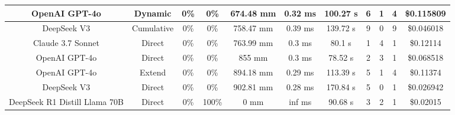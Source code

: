 \begin{landscape}
\begin{table}[H]
\begin{center}
\begin{tabular}{|c|c|c|c|c|c|c|c|c|c|c|}
    OpenAI GPT-4o & Dynamic & 0\% & 0\% & 674.48 mm & 0.32 ms & 100.27 s & 6 & 1 & 4 & \$0.115809 \\
    \hline
    DeepSeek V3 & Cumulative & 0\% & 0\% & 758.47 mm & 0.39 ms & 139.72 s & 9 & 0 & 9 & \$0.046018 \\
    \hline
    Claude 3.7 Sonnet & Direct & 0\% & 0\% & 763.99 mm & 0.3 ms & 80.1 s & 1 & 4 & 1 & \$0.12114 \\
    \hline
    OpenAI GPT-4o & Direct & 0\% & 0\% & 855 mm & 0.3 ms & 78.52 s & 2 & 3 & 1 & \$0.068518 \\
    \hline
    OpenAI GPT-4o & Extend & 0\% & 0\% & 894.18 mm & 0.29 ms & 113.39 s & 5 & 1 & 4 & \$0.11374 \\
    \hline
    DeepSeek V3 & Direct & 0\% & 0\% & 902.81 mm & 0.28 ms & 170.84 s & 5 & 0 & 1 & \$0.026942 \\
    \hline
    DeepSeek R1 Distill Llama 70B & Direct & 0\% & 100\% & 0 mm & inf ms & 90.68 s & 3 & 2 & 1 & \$0.02015 \\
    \hline
\end{tabular}
\label{Results-Position-1-3}
\end{center}
\end{table}


\end{landscape}
